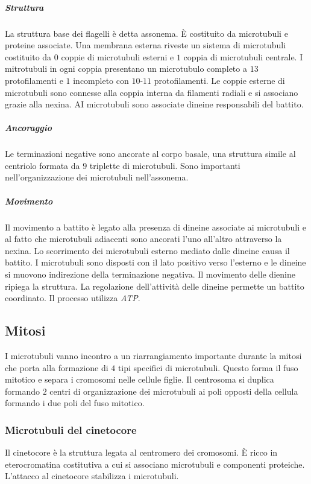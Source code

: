 				\subparagraph{Struttura}
				La struttura base dei flagelli \`e detta assonema.
				\`E costituito da microtubuli e proteine associate.
				Una membrana esterna riveste un sistema di microtubuli costituito da $0$ coppie di microtubuli esterni e $1$ coppia di microtubuli centrale.
				I mitrotubuli in ogni coppia presentano un microtubulo completo a $13$ protofilamenti e $1$ incompleto con $10$-$11$ protofilamenti.
				Le coppie esterne di microtubuli sono connesse alla coppia interna da filamenti radiali e si associano grazie alla nexina.
				AI microtubuli sono associate dineine responsabili del battito.

				\subparagraph{Ancoraggio}
				Le terminazioni negative sono ancorate al corpo basale, una struttura simile al centriolo formata da $9$ triplette di microtubuli.
				Sono importanti nell'organizzazione dei microtubuli nell'assonema.

				\subparagraph{Movimento}
				Il movimento a battito \`e legato alla presenza di dineine associate ai microtubuli e al fatto che microtubuli adiacenti sono ancorati l'uno all'altro attraverso la nexina.
				Lo scorrimento dei microtubuli esterno mediato dalle dineine causa il battito.
				I microtubuli sono disposti con il lato positivo verso l'esterno e le dineine si muovono indirezione della terminazione negativa.
				Il movimento delle dienine ripiega la struttura.
				La regolazione dell'attivit\`a delle dineine permette un battito coordinato.
				Il processo utilizza \emph{ATP}.

	\subsection{Mitosi}
	I microtubuli vanno incontro a un riarrangiamento importante durante la mitosi che porta alla formazione di $4$ tipi specifici di microtubuli.
	Questo forma il fuso mitotico e separa i cromosomi nelle cellule figlie.
	Il centrosoma si duplica formando $2$ centri di organizzazione dei microtubuli ai poli opposti della cellula formando i due poli del fuso mitotico.

		\subsubsection{Microtubuli del cinetocore}
		Il cinetocore \`e la struttura legata al centromero dei cromosomi.
		\`E ricco in eterocromatina costitutiva a cui si associano microtubuli e componenti proteiche.
		L'attacco al cinetocore stabilizza i microtubuli.

